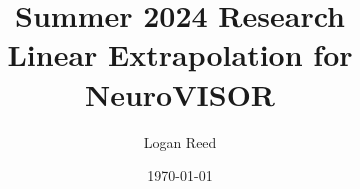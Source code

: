 




\renewcommand\and{\\[\baselineskip]}

\title{Summer 2024 Research \\ \Large \normalfont Linear Extrapolation for NeuroVISOR}
\author{Logan Reed}
\date{\today}




    







